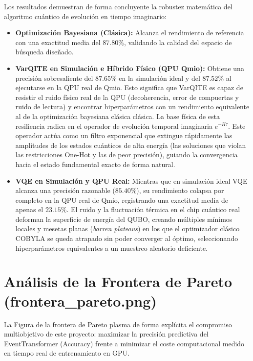Los resultados demuestran de forma concluyente la robustez matemática del algoritmo cuántico de evolución en tiempo imaginario:
\begin{itemize}
    \item \textbf{Optimización Bayesiana (Clásica):} Alcanza el rendimiento de referencia con una exactitud media del $87.80\%$, validando la calidad del espacio de búsqueda diseñado.
    \item \textbf{VarQITE en Simulación e Híbrido Físico (QPU Qmio):} Obtiene una precisión sobresaliente del $87.65\%$ en la simulación ideal y del $87.52\%$ al ejecutarse en la QPU real de Qmio. Esto significa que VarQITE es capaz de resistir el ruido físico real de la QPU (decoherencia, error de compuertas y ruido de lectura) y encontrar hiperparámetros con un rendimiento equivalente al de la optimización bayesiana clásica clásica. La base física de esta resiliencia radica en el operador de evolución temporal imaginaria $e^{-H\tau}$. Este operador actúa como un filtro exponencial que extingue rápidamente las amplitudes de los estados cuánticos de alta energía (las soluciones que violan las restricciones One-Hot y las de peor precisión), guiando la convergencia hacia el estado fundamental exacto de forma natural.
    \item \textbf{VQE en Simulación y QPU Real:} Mientras que en simulación ideal VQE alcanza una precisión razonable ($85.40\%$), su rendimiento colapsa por completo en la QPU real de Qmio, registrando una exactitud media de apenas el $23.15\%$. El ruido y la fluctuación térmica en el chip cuántico real deforman la superficie de energía del QUBO, creando múltiples mínimos locales y mesetas planas (\textit{barren plateaus}) en los que el optimizador clásico COBYLA se queda atrapado sin poder converger al óptimo, seleccionando hiperparámetros equivalentes a un muestreo aleatorio deficiente.
\end{itemize}

\section{Análisis de la Frontera de Pareto (frontera\_pareto.png)}
\label{sec:analisis_pareto}

La Figura de la frontera de Pareto plasma de forma explícita el compromiso multiobjetivo de este proyecto: maximizar la precisión predictiva del EventTransformer (Accuracy) frente a minimizar el coste computacional medido en tiempo real de entrenamiento en GPU.

